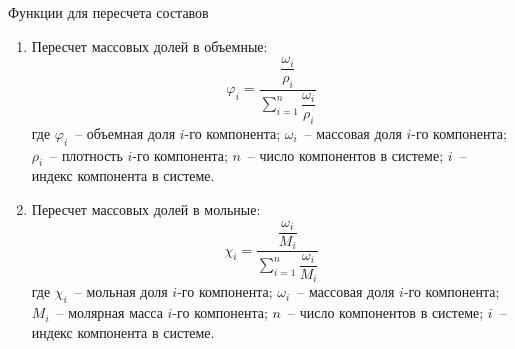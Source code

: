 \documentclass[aspectratio=169, mathserif]{beamer}	%
\begin{document}

\begin{frame}[fragile]{Функции для пересчета составов}
\scriptsize
\begin{enumerate}
\item Пересчет массовых долей в объемные:
\vfill
\begin{equation*}
	\varphi _i = \dfrac{\dfrac{\omega _i}{\rho _i}}{\sum \limits _{i=1}^{n} \dfrac{\omega _i}{\rho _i}}
\end{equation*}
\vfill
где $\varphi _i$~-- объемная доля $i$-го компонента; $\omega _i$~-- массовая доля $i$-го компонента; $\rho _i$~-- плотность $i$-го компонента; $n$~-- число компонентов в системе; $i$~-- индекс компонента в системе.
\vfill
\item Пересчет массовых долей в мольные:
\vfill
$$
	\chi _i = \dfrac{\dfrac{\omega _i}{M_i}}{\sum \limits_{i=1}^{n}\dfrac{\omega _i}{M_i}}
$$
\vfill
где $\chi _i$~-- мольная доля $i$-го компонента; $\omega _i$~-- массовая доля $i$-го компонента; $M_i$~-- молярная масса $i$-го компонента; $n$~-- число компонентов в системе; $i$~-- индекс компонента в системе.
\vfill
\end{enumerate}
\vfill
\end{frame}
\end{document}
